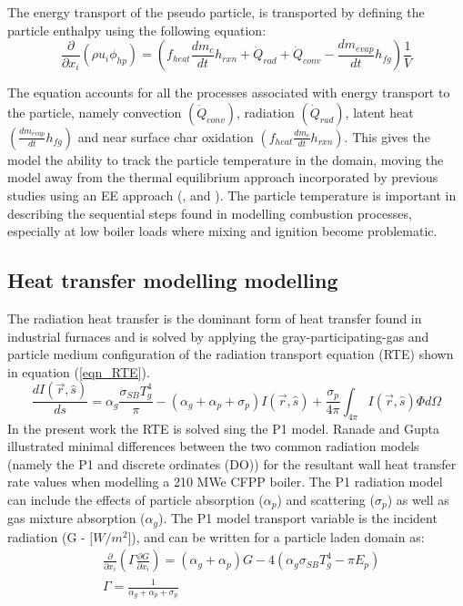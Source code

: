 \documentclass[review]{elsarticle}
\begin{document}
The energy transport of the pseudo particle, is transported by defining the particle enthalpy using the following equation:
\begin{equation}\label{eqn_phi_hp}
\frac{\partial}{\partial x_{i}}(\rho u_{i} \phi_{hp})=\left(f_{heat}\frac{dm_{c}}{dt}h_{rxn} + \dot{Q}_{rad} + \dot{Q}_{conv} - \frac{dm_{evap}}{dt}h_{fg}\right)\frac{1}{V}
\end{equation}

The equation accounts for all the processes associated with energy transport to the particle, namely convection $\left(\dot{Q}_{conv}\right)$, radiation $\left(\dot{Q}_{rad}\right)$, latent heat $\left(\frac{dm_{evap}}{dt}h_{fg}\right)$ and near surface char oxidation $\left(f_{heat}\frac{dm_{c}}{dt}h_{rxn}\right)$. This gives the model the ability to track the particle temperature in the domain, moving the model away from the thermal equilibrium approach incorporated by previous studies using an EE approach (\cite{Benim2005}, \cite{Vicente2003} and \cite{Cai2015}). The particle temperature is important in describing the sequential steps found in modelling combustion processes, especially at low boiler loads where mixing and ignition become problematic.

\subsection{Heat transfer modelling modelling}
The radiation heat transfer is the dominant form of heat transfer found in industrial furnaces \citep{Basu2000} and is solved by applying the gray-participating-gas and particle medium configuration of the radiation transport equation (RTE) \cite{Modest2013} shown in equation (\ref{eqn_RTE}).
\begin{equation}\label{eqn_RTE}
\frac{d I(\vec{r},\hat{s})}{ds} = \alpha_g \frac{\sigma_{SB} T_{g}^4}{\pi}-(\alpha_g+\alpha_p+\sigma_p)I(\vec{r},\hat{s}) + \frac{\sigma_p}{4\pi}\int_{4\pi}I(\vec{r},\hat{s})\Phi d \Omega
\end{equation}
In the present work the RTE is solved sing the P1 model. Ranade and Gupta \cite{Ranade2015} illustrated minimal differences between the two common radiation models (namely the P1 and discrete ordinates (DO)) for the resultant wall heat transfer rate values when modelling a 210 MWe CFPP boiler. The P1 radiation model can include the effects of particle absorption ($\alpha_p$) and scattering ($\sigma_p$) as well as gas mixture absorption ($\alpha_g$). The P1 model transport variable is the incident radiation (G - [$W/m^2$]), and can be written for a particle laden domain as:
\begin{equation}
\begin{split}
&\frac{\partial}{\partial x_{i}}\left(\Gamma\frac{\partial G}{\partial x_{i}}\right)=\left(\alpha_g+\alpha_p\right)G-4\left(\alpha_g \sigma_{SB} T_{g}^4-\pi E_p \right)\\
&\Gamma = \frac{1}{\alpha_g+\alpha_p+\sigma_p}
\end{split}
\end{equation}
\end{document}
